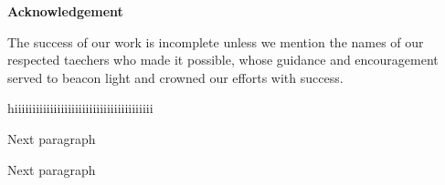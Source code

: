 \begin{center}
\begin{huge}
\bfseries{Acknowledgement}\\
\end{huge}
\end{center}
\vspace{1cm}
The success of our work is incomplete unless we mention the names of our respected taechers who made it possible, whose guidance and encouragement served to beacon light and crowned our efforts with success.

hiiiiiiiiiiiiiiiiiiiiiiiiiiiiiiiiiiiiiii

\noindent Next paragraph

\noindent Next paragraph
